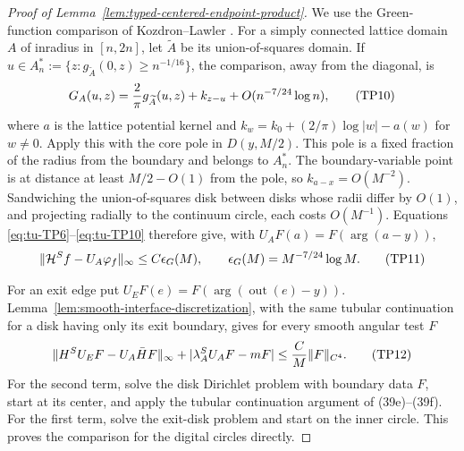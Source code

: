 \begin{proof}[Proof of Lemma~\ref{lem:typed-centered-endpoint-product}]
We use the Green-function comparison of Kozdron--Lawler
\cite[Corollary~3.5, equation~(30)]{KozdronLawler2005}.
For a simply connected lattice domain \(A\) of inradius in \([n,2n]\),
let \(\widetilde A\) be its union-of-squares domain. If
\(u\in A_n^*:=\{z:g_{\widetilde A}(0,z)\ge n^{-1/16}\}\), the
comparison, away from the diagonal, is
\begin{equation}
 G_A(u,z)={2\over\pi}g_{\widetilde A}(u,z)+k_{z-u}
                 +O(n^{-7/24}\log n),                    \tag{TP10}\label{eq:tu-TP10}
\end{equation}
where \(a\) is the lattice potential kernel and
\(k_w=k_0+(2/\pi)\log|w|-a(w)\) for \(w\ne0\).
Apply this with the core pole in \(D(y,M/2)\). This pole is a fixed
fraction of the radius from the boundary and belongs to \(A_n^*\).
The boundary-variable point is at distance at least \(M/2-O(1)\) from
the pole, so \(k_{a-x}=O(M^{-2})\). Sandwiching the union-of-squares
disk between disks whose radii differ by \(O(1)\), and projecting
radially to the continuum circle, each costs \(O(M^{-1})\).
Equations
\eqref{eq:tu-TP6}--\eqref{eq:tu-TP10} therefore give, with
\(U_AF(a)=F(\arg(a-y))\),
\begin{equation}
 \|{\cal H}^Sf-U_A\varphi_f\|_\infty
       \le C\epsilon_G(M),\qquad
 \epsilon_G(M)=M^{-7/24}\log M.                           \tag{TP11}\label{eq:tu-TP11}
\end{equation}

For an exit edge put \(U_EF(e)=F(\arg(\operatorname{out}(e)-y))\).
Lemma~\ref{lem:smooth-interface-discretization}, with the same tubular
continuation for a disk having only its exit boundary, gives for every
smooth angular test \(F\)
\begin{equation}
 \|H^SU_EF-U_A\bar HF\|_\infty
       +|\lambda_A^SU_AF-mF|
       \le {C\over M}\|F\|_{C^4}.                         \tag{TP12}\label{eq:tu-TP12}
\end{equation}
For the second term, solve the disk Dirichlet problem with boundary data
\(F\), start at its center, and apply the tubular continuation argument
of (39e)--(39f). For the first term, solve the exit-disk problem and
start on the inner circle. This proves the comparison for the digital
circles directly.


\end{proof}
